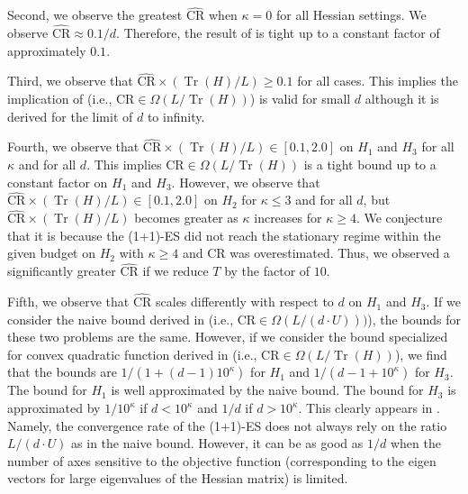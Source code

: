 \documentclass[journal]{IEEEtran}
\DeclareMathOperator{\Tr}{Tr}     %
\renewcommand{\geq}{\geqslant} %
\renewcommand{\leq}{\leqslant} %
\theoremstyle{definition}
\begin{document}
Second, we observe the greatest $\widehat{\mathrm{CR}}$ when $\kappa = 0$ for all Hessian settings. We observe $\widehat{\mathrm{CR}} \approx 0.1 / d$. Therefore, the result of  is tight up to a constant factor of approximately $0.1$. 

Third, we observe that $\widehat{\mathrm{CR}} \times (\Tr(H) / L) \geq 0.1$ for all cases.
This implies the implication of  (i.e., $\mathrm{CR} \in \Omega(L/\Tr(H))$) is valid for small $d$ although it is derived for the limit of $d$ to infinity.

Fourth, we observe that $\widehat{\mathrm{CR}} \times (\Tr(H) / L) \in [0.1, 2.0]$ on $H_1$ and $H_3$ for all $\kappa$ and for all $d$. This implies $\mathrm{CR} \in \Omega(L/\Tr(H))$ is a tight bound up to a constant factor on $H_1$ and $H_3$. 
However, we observe that $\widehat{\mathrm{CR}} \times (\Tr(H) / L) \in [0.1, 2.0]$ on $H_2$ for $\kappa \leq 3$ and for all $d$, but $\widehat{\mathrm{CR}} \times (\Tr(H) / L)$ becomes greater as $\kappa$ increases for $\kappa \geq 4$. We conjecture that it is because the (1+1)-ES did not reach the stationary regime within the given budget on $H_2$ with $\kappa \geq 4$ and $\mathrm{CR}$ was overestimated. Thus, we observed a significantly greater $\widehat{\mathrm{CR}}$ if we reduce $T$ by the factor of $10$.

Fifth, we observe that $\widehat{\mathrm{CR}}$ scales differently with respect to $d$ on $H_1$ and $H_3$. If we consider the naive bound derived in  (i.e., $\mathrm{CR} \in \Omega(L/(d\cdot U)))$), the bounds for these two problems are the same. However, if we consider the bound specialized for convex quadratic function derived in  (i.e., $\mathrm{CR} \in \Omega(L/\Tr(H))$), we find that the bounds are $1 / (1 + (d-1)10^{\kappa})$ for $H_1$ and $1 / (d-1 + 10^{\kappa})$ for $H_3$. The bound for $H_1$ is well approximated by the naive bound. The bound for $H_3$ is approximated by $1/10^{\kappa}$ if $d < 10^{\kappa}$ and $1/d$ if $d > 10^{\kappa}$. This clearly appears in . Namely, the convergence rate of the (1+1)-ES does not always rely on the ratio $L/(d\cdot U)$ as in the naive bound. However, it can be as good as $1/d$ when the number of axes sensitive to the objective function (corresponding to the eigen vectors for large eigenvalues of the Hessian matrix) is limited.
\end{document}
